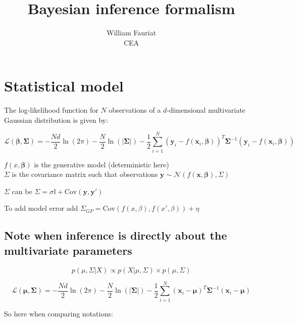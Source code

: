 \documentclass[11pt]{article}
\title{Bayesian inference formalism}
\author{William Fauriat \\ \small CEA}
\begin{document}
\maketitle

\section{Statistical model}

The log-likelihood function for $N$ observations of a $d$-dimensional multivariate Gaussian distribution is given by:

\begin{equation*}
\mathcal{L}(\boldsymbol{\beta}, \boldsymbol{\Sigma}) = 
-\frac{N d}{2} \ln(2\pi) - \frac{N}{2} \ln(|\boldsymbol{\Sigma}|) - 
\frac{1}{2} \sum_{i=1}^{N} (\mathbf{y}_i - 
f(\mathbf{x}_i, \boldsymbol{\beta}))^T \boldsymbol{\Sigma}^{-1}
 (\mathbf{y}_i - f(\mathbf{x}_i, \boldsymbol{\beta}))
\end{equation*}

\noindent $f(x,\boldsymbol{\beta})$ is the generative model (deterministic here) \\

\noindent $\Sigma$ is the covariance matrix such that observations $\mathbf{y} \sim 
\mathcal{N}(f(\mathbf{x},\boldsymbol{\beta}), \Sigma )$

\noindent $\Sigma$ can be 
$\Sigma = \sigma \mathbb{I} + \text{Cov}(\mathbf{y}, \mathbf{y'})$

\noindent To add model error add 
$\Sigma_{GP} = \text{Cov}(f(x,\beta), f(x',\beta)) + \eta$


\subsection{Note when inference is directly about the multivariate parameters}

\begin{equation*}
    p(\mu,\Sigma|X) \propto p(X|\mu, \Sigma) \times p(\mu,\Sigma)
\end{equation*}

\begin{equation*}
   \mathcal{L}(\boldsymbol{\mu}, \boldsymbol{\Sigma}) = 
   -\frac{N d}{2} \ln(2\pi) - \frac{N}{2} \ln(|\boldsymbol{\Sigma}|) - 
   \frac{1}{2} \sum_{i=1}^{N} (\mathbf{x}_i - \boldsymbol{\mu})^T 
   \boldsymbol{\Sigma}^{-1} (\mathbf{x}_i - \boldsymbol{\mu})
\end{equation*}

So here when comparing notations: \\ 
\medskip
\end{document}

